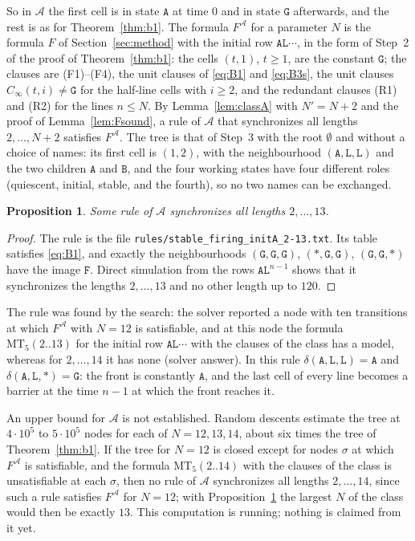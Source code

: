 \documentclass[11pt]{article}
\newtheorem{proposition}[lemma]{Proposition}
\theoremstyle{remark}
\newcommand{\Lq}{\mathtt{L}}\newcommand{\Gq}{\mathtt{G}}\newcommand{\Aq}{\mathtt{A}}\newcommand{\Bq}{\mathtt{B}}\newcommand{\Fq}{\mathtt{F}}
\newcommand{\MT}{\mathrm{MT}}
\begin{document}
So in $\mathcal A$ the first cell is in state $\Aq$ at time $0$ and in state $\Gq$ afterwards, and the rest
is as for Theorem~\ref{thm:b1}. The formula $F^{\mathcal A}$ for a parameter $N$ is the formula $F$ of
Section~\ref{sec:method} with the initial row $\Aq\Lq\cdots$, in the form of Step~2 of the proof of
Theorem~\ref{thm:b1}: the cells $(t,1)$, $t\ge1$, are the constant $\Gq$; the clauses are (F1)--(F4), the unit
clauses of \eqref{eq:B1} and \eqref{eq:B3s}, the unit clauses $C_\infty(t,i)\ne\Gq$ for the half-line cells
with $i\ge2$, and the redundant clauses (R1) and (R2) for the lines $n\le N$. By Lemma~\ref{lem:classA} with
$N'=N+2$ and the proof of Lemma~\ref{lem:Fsound}, a rule of $\mathcal A$ that synchronizes all lengths
$2,\dots,N+2$ satisfies $F^{\mathcal A}$. The tree is that of Step~3 with the root $\emptyset$ and without a
choice of names: its first cell is $(1,2)$, with the neighbourhood $(\Aq,\Lq,\Lq)$ and the two children
$\Aq$ and $\Bq$, and the four working states have four different roles (quiescent, initial, stable, and the
fourth), so no two names can be exchanged.

\begin{proposition}\label{prop:classA13}
Some rule of $\mathcal A$ synchronizes all lengths $2,\dots,13$.
\end{proposition}

\begin{proof}
The rule is the file \texttt{rules/stable\_firing\_initA\_2-13.txt}. Its table satisfies \eqref{eq:B1}, and
exactly the neighbourhoods $(\Gq,\Gq,\Gq)$, $(\ast,\Gq,\Gq)$, $(\Gq,\Gq,\ast)$ have the image $\Fq$. Direct
simulation from the rows $\Aq\Lq^{n-1}$ shows that it synchronizes the lengths $2,\dots,13$ and no other
length up to $120$.
\end{proof}

The rule was found by the search: the solver reported a node with ten transitions at which
$F^{\mathcal A}$ with $N=12$ is satisfiable, and at this node the formula $\MT_5(2..13)$ for the initial row
$\Aq\Lq\cdots$ with the clauses of the class has a model, whereas for $2,\dots,14$ it has none (solver answer).
In this rule $\delta(\Aq,\Lq,\Lq)=\Aq$ and $\delta(\Aq,\Lq,\ast)=\Gq$: the front is constantly $\Aq$, and the
last cell of every line becomes a barrier at the time $n-1$ at which the front reaches it.

An upper bound for $\mathcal A$ is not established. Random descents estimate the tree at $4\cdot10^5$ to
$5\cdot10^5$ nodes for each of $N=12,13,14$, about six times the tree of Theorem~\ref{thm:b1}. If the tree for
$N=12$ is closed except for nodes $\sigma$ at which $F^{\mathcal A}$ is satisfiable, and the formula
$\MT_5(2..14)$ with the clauses of the class is unsatisfiable at each $\sigma$, then no rule of $\mathcal A$
synchronizes all lengths $2,\dots,14$, since such a rule satisfies $F^{\mathcal A}$ for $N=12$; with
Proposition~\ref{prop:classA13} the largest $N$ of the class would then be exactly $13$. This computation is
running; nothing is claimed from it yet.
\end{document}
